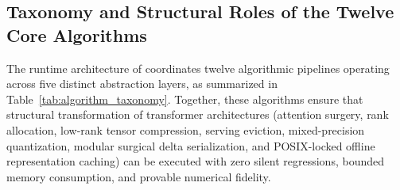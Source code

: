 \subsection{Taxonomy and Structural Roles of the Twelve Core Algorithms}
\label{subsec:alg_taxonomy}

The runtime architecture of \neuralops{} coordinates twelve algorithmic pipelines operating across five distinct abstraction layers, as summarized in Table~\ref{tab:algorithm_taxonomy}. Together, these algorithms ensure that structural transformation of transformer architectures (attention surgery, rank allocation, low-rank tensor compression, serving eviction, mixed-precision quantization, modular surgical delta serialization, and POSIX-locked offline representation caching) can be executed with zero silent regressions, bounded memory consumption, and provable numerical fidelity.

